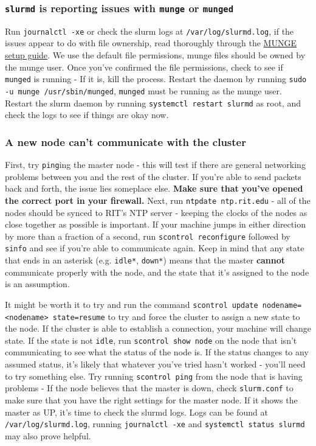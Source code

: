 \documentclass[a4paper]{article}
\begin{document}
\subsubsection*{\texttt{slurmd} is reporting issues with \texttt{munge} or \texttt{munged}}
Run \texttt{journalctl -xe} or check the slurm logs at \texttt{/var/log/slurmd.log}, if the issues appear to do with file ownership, read thoroughly through the \href{https://github.com/dun/munge/wiki/Installation-Guide}{MUNGE setup guide}.
We use the default file permissions, munge files should be owned by the munge user.
Once you've confirmed the file permissions, check to see if \texttt{munged} is running - If it is, kill the process.
Restart the daemon by running \texttt{sudo -u munge /usr/sbin/munged}, \texttt{munged} must be running as the munge user.
Restart the slurm daemon by running \texttt{systemctl restart slurmd} as root, and check the logs to see if things are okay now.

\subsubsection*{A new node can't communicate with the cluster}
First, try \texttt{ping}ing the master node - this will test if there are general networking problems between you and the rest of the cluster.
If you're able to send packets back and forth, the issue lies someplace else.
\textbf{Make sure that you've opened the correct port in your firewall.}
Next, run \texttt{ntpdate ntp.rit.edu} - all of the nodes should be synced to RIT's NTP server - keeping the clocks of the nodes as close together as possible is important.
If your machine jumps in either direction by more than a fraction of a second, run \texttt{scontrol reconfigure} followed by \texttt{sinfo} and see if you're able to communicate again.
Keep in mind that any state that ends in an asterisk (e.g. \texttt{idle*}, \texttt{down*}) means that the master \textbf{cannot} communicate properly with the node, and the state that it's assigned to the node is an assumption. 

It might be worth it to try and run the command \texttt{scontrol update nodename=<nodename> state=resume} to try and force the cluster to assign a new state to the node.
If the cluster is able to establish a connection, your machine will change state.
If the state is not \texttt{idle}, run \texttt{scontrol show node} on the node that isn't communicating to see what the status of the node is.
If the status changes to any assumed status, it's likely that whatever you've tried hasn't worked - you'll need to try something else.
Try running \texttt{scontrol ping} from the node that is having problems - If the node believes that the master is down, check \texttt{slurm.conf} to make sure that you have the right settings for the master node.
If it shows the master as UP, it's time to check the slurmd logs.
Logs can be found at \texttt{/var/log/slurmd.log}, running \texttt{journalctl -xe} and \texttt{systemctl status slurmd} may also prove helpful.
\end{document}
